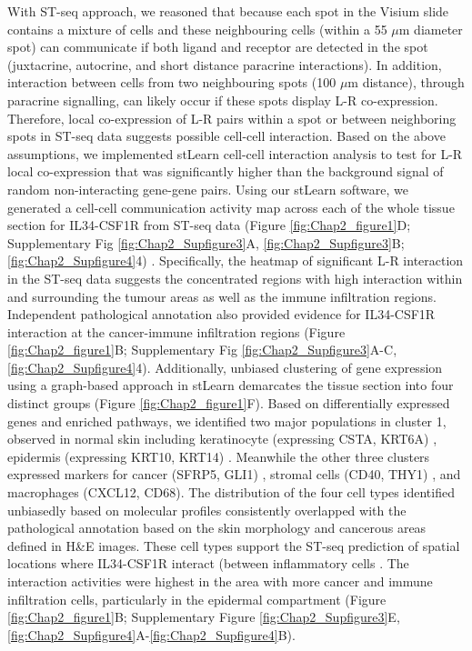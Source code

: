 With ST-seq approach, we reasoned that because each spot in the Visium slide contains a mixture of cells and these neighbouring cells (within a 55 $\mu$m diameter spot) can communicate if both ligand and receptor are detected in the spot (juxtacrine, autocrine, and short distance paracrine interactions). In addition, interaction between cells from two neighbouring spots (100 $\mu$m distance), through paracrine signalling, can likely occur if these spots display L-R co-expression. Therefore, local co-expression of L-R pairs within a spot or between neighboring spots in ST-seq data suggests possible cell-cell interaction. Based on the above assumptions, we implemented stLearn cell-cell interaction analysis to test for L-R local co-expression that was significantly higher than the background signal of random non-interacting gene-gene pairs. Using our stLearn software, we generated a cell-cell communication activity map across each of the whole tissue section for IL34-CSF1R from ST-seq data (Figure \ref{fig:Chap2_figure1}D; Supplementary Fig \ref{fig:Chap2_Supfigure3}A, \ref{fig:Chap2_Supfigure3}B; \ref{fig:Chap2_Supfigure4}4) \cite{pham2020stlearn}. Specifically, the heatmap of significant L-R interaction in the ST-seq data suggests the concentrated regions with high interaction within and surrounding the tumour areas as well as the immune infiltration regions. Independent pathological annotation also provided evidence for IL34-CSF1R interaction at the cancer-immune infiltration regions (Figure \ref{fig:Chap2_figure1}B; Supplementary Fig \ref{fig:Chap2_Supfigure3}A-C, \ref{fig:Chap2_Supfigure4}4). Additionally, unbiased clustering of gene expression using a graph-based approach in stLearn demarcates the tissue section into four distinct groups (Figure \ref{fig:Chap2_figure1}F). Based on differentially expressed genes and enriched pathways, we identified two major populations in cluster 1, observed in normal skin including keratinocyte (expressing CSTA, KRT6A) \cite{finnegan2019single}, epidermis (expressing KRT10, KRT14) \cite{ji2020multimodal}. Meanwhile the other three clusters expressed markers for cancer (SFRP5, GLI1) \cite{lacour2002carcinogenesis, ji2020multimodal}, stromal cells (CD40, THY1) \cite{koumas2003thy}, and macrophages (CXCL12, CD68). The distribution of the four cell types identified unbiasedly based on molecular profiles consistently overlapped with the pathological annotation based on the skin morphology and cancerous areas defined in H\&E images. These cell types support the ST-seq prediction of spatial locations where IL34-CSF1R interact (between inflammatory cells \cite{lin2019function}. The interaction activities were highest in the area with more cancer and immune infiltration cells, particularly in the epidermal compartment (Figure \ref{fig:Chap2_figure1}B; Supplementary Figure \ref{fig:Chap2_Supfigure3}E, \ref{fig:Chap2_Supfigure4}A-\ref{fig:Chap2_Supfigure4}B).  

